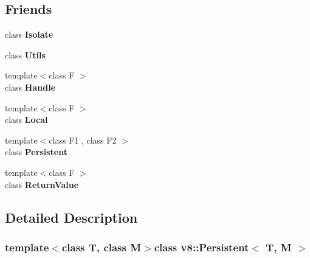 \subsection*{Friends}
\begin{DoxyCompactItemize}
\item 
\hypertarget{classv8_1_1_persistent_aba4f0964bdacf2bbf62cf876e5d28d0a}{}class {\bfseries Isolate}\label{classv8_1_1_persistent_aba4f0964bdacf2bbf62cf876e5d28d0a}

\item 
\hypertarget{classv8_1_1_persistent_abc0f7da619e9e72510dc07ed7b5ff6d8}{}class {\bfseries Utils}\label{classv8_1_1_persistent_abc0f7da619e9e72510dc07ed7b5ff6d8}

\item 
\hypertarget{classv8_1_1_persistent_a67ca1a2d91273eaf85fb3d23ba8ce984}{}{\footnotesize template$<$class F $>$ }\\class {\bfseries Handle}\label{classv8_1_1_persistent_a67ca1a2d91273eaf85fb3d23ba8ce984}

\item 
\hypertarget{classv8_1_1_persistent_afb872edb4aac7ba55f0da004113aa2b0}{}{\footnotesize template$<$class F $>$ }\\class {\bfseries Local}\label{classv8_1_1_persistent_afb872edb4aac7ba55f0da004113aa2b0}

\item 
\hypertarget{classv8_1_1_persistent_ad845ec8872174be0a9ca9a3dd1898d30}{}{\footnotesize template$<$class F1 , class F2 $>$ }\\class {\bfseries Persistent}\label{classv8_1_1_persistent_ad845ec8872174be0a9ca9a3dd1898d30}

\item 
\hypertarget{classv8_1_1_persistent_a53f604d3d6f2dc0647df33c9979f116a}{}{\footnotesize template$<$class F $>$ }\\class {\bfseries Return\+Value}\label{classv8_1_1_persistent_a53f604d3d6f2dc0647df33c9979f116a}

\end{DoxyCompactItemize}


\subsection{Detailed Description}
\subsubsection*{template$<$class T, class M$>$class v8\+::\+Persistent$<$ T, M $>$}

